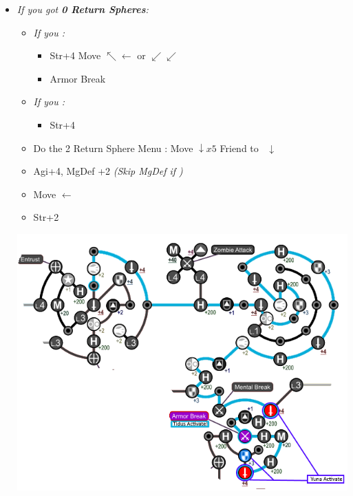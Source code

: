 \begin{spheregrid}
\begin{multicols}{2}
\begin{itemize}
\begin{itemize}
              \columnbreak
        \item \textit{If you got \textbf{0 Return Spheres}:}
              \begin{itemize}
              \item \textit{If you \wonblitz:}
              \begin{itemize}
                \tidusf Move to Str+4 by Mental Break $\rightarrow x3, \downarrow, \rightarrow x3$
                \yunaf Friend Sphere to \tidus
                \item Str+4
                \tidusf Move $\nwarrow\leftarrow$ or $\swarrow\swarrow$
                \item Armor Break
                \end{itemize}
		\item \textit{If you \lostblitz:}
                \begin{itemize}
                \tidusf Move to Armor Break $\rightarrow x3, \downarrow x6$
                \tidusf Armor Break
                \tidusf Move to HP $\searrow\searrow$
                      \yunaf Friend Sphere to \tidus
                \item Str+4
               \end{itemize}
                \item Do the 2 Return Sphere Menu
                \rikkuf: Move $\downarrow x5$
                \yunaf Friend to \rikku\ $\downarrow$
                \item Agi+4, MgDef +2 \textit{(Skip MgDef if \blitzloss)}
                \item Move $\leftarrow$
                \item Str+2
              \end{itemize}
              \includegraphics[width=.9\columnwidth]{graphics/0_returns}

\end{itemize}
\end{itemize}
\end{multicols}
\end{spheregrid}
